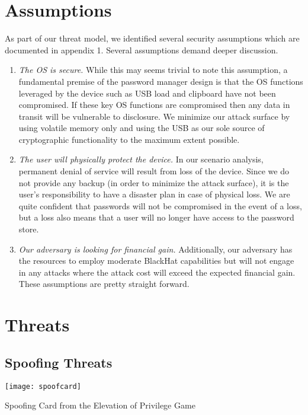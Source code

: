 \section{Assumptions}
\label{sec:assumptions}
As part of our threat model, we identified several security assumptions which
are documented in appendix 1.  Several assumptions demand deeper discussion.
\begin{enumerate}
    \item{\emph{The OS is secure.} While this may seems trivial to note this
assumption, a fundamental premise of the password manager design is that the OS
functions leveraged by the device such as USB load and clipboard have not been
compromised.  If these key OS functions are compromised then any data in transit
will be vulnerable to disclosure.  We minimize our attack surface by using
volatile memory only and using the USB as our sole source of cryptographic
functionality to the maximum extent possible.}
    \item{\emph{The user will physically protect the device.} In our scenario
analysis, permanent denial of service will result from loss of the device.
Since we do not provide any backup (in order to minimize the attack surface), it
is the user's responsibility to have a disaster plan in case of physical loss.
We are quite confident that passwords will not be compromised in the event of a
loss, but a loss also means that a user will no longer have access to the
password store.}
    \item{\emph{Our adversary is looking for financial gain.} Additionally, our
adversary has the resources to employ moderate BlackHat capabilities but will
not engage in any attacks where the attack cost will exceed the expected
financial gain.}  These assumptions are pretty
straight forward.
\end{enumerate}


\section{Threats}
\label{sec:threats}

\subsection{Spoofing Threats}

\begin{marginfigure}%
\centering
  \texttt{[image: spoofcard]}
  \caption{Spoofing Card from the Elevation of Privilege Game}
  \label{fig:spoofcard}
\end{marginfigure}

